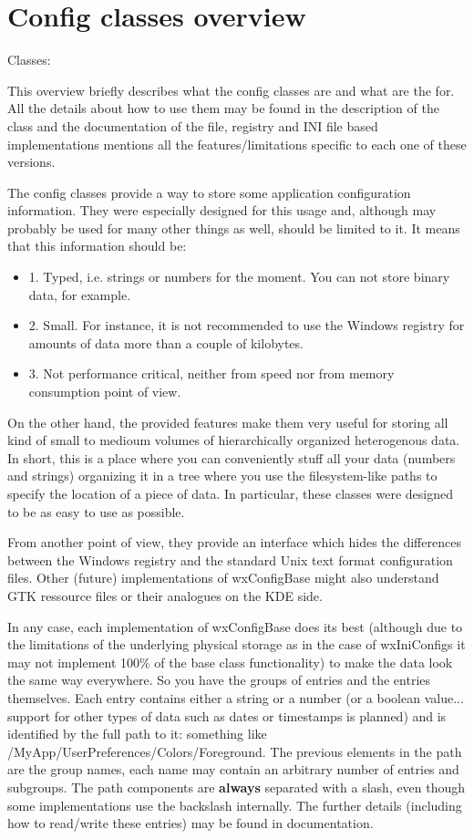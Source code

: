 \section{Config classes overview}\label{wxconfigoverview}

Classes: 

This overview briefly describes what the config classes are and what are the
for. All the details about how to use them may be found in the description of
the  class and the documentation of the
file, registry and INI file based implementations mentions all the
features/limitations specific to each one of these versions.

The config classes provide a way to store some application configuration
information. They were especially designed for this usage and, although may
probably be used for many other things as well, should be limited to it. It
means that this information should be:
\begin{itemize}
\item{1.} Typed, i.e. strings or numbers for the moment. You can not store
binary data, for example.
\item{2.} Small. For instance, it is not recommended to use the Windows
registry for amounts of data more than a couple of kilobytes.
\item{3.} Not performance critical, neither from speed nor from memory
consumption point of view.
\end{itemize}

On the other hand, the provided features make them very useful for storing all
kind of small to medioum volumes of hierarchically organized heterogenous
data. In short, this is a place where you can conveniently stuff all your data
(numbers and strings) organizing it in a tree where you use the
filesystem-like paths to specify the location of a piece of data. In
particular, these classes were designed to be as easy to use as possible.

From another point of view, they provide an interface which hides the
differences between the Windows registry and the standard Unix text format
configuration files. Other (future) implementations of wxConfigBase might also
understand GTK ressource files or their analogues on the KDE side.

In any case, each implementation of wxConfigBase does its best (although due
to the limitations of the underlying physical storage as in the case of
wxIniConfigs it may not implement 100\% of the base class functionality) to
make the data look the same way everywhere. So you have the groups of entries
and the entries themselves. Each entry contains either a string or a number
(or a boolean value... support for other types of data such as dates or
timestamps is planned) and is identified by the full path to it: something
like /MyApp/UserPreferences/Colors/Foreground. The previous elements in the
path are the group names, each name may contain an arbitrary number of entries
and subgroups. The path components are {\bf always} separated with a slash,
even though some implementations use the backslash internally. The further
details (including how to read/write these entries) may be found in
 documentation.
